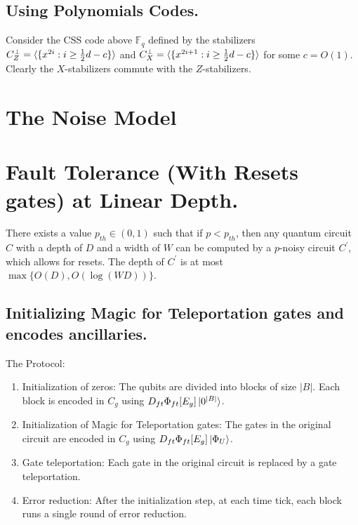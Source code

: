 \documentclass[manuscript,screen,review]{acmart}
\begin{document}
{\subsection{Using Polynomials Codes.} Consider the CSS code above $\mathbb{F}_{q}$ defined by the stabilizers $C_{Z}^{\perp} = \braket{\{ x^{2i} : i\ge \frac{1}{2}d - c \}}$ and $C_{X}^{\perp} = \braket{\{ x^{2i+1} : i \ge \frac{1}{2}d - c \}}$ for some $c = O(1)$. Clearly the $X$-stabilizers commute with the $Z$-stabilizers. 



\section{ The Noise Model }


\section{ Fault Tolerance (With Resets gates) at Linear Depth. } 

\begin{claim}
There exists a value $p_{th} \in (0,1)$ such that if $p < p_{th}$, then any quantum circuit $C$ with a depth of $D$ and a width of $W$ can be computed by a $p$-noisy circuit $C^{\prime}$, which allows for resets. The depth of $C^{\prime}$ is at most $\max{ \{O(D), O(\log(WD)) \} }$.
\end{claim}


\subsection{Initializing Magic for Teleportation gates and encodes ancillaries.}
The Protocol: \begin{enumerate}
  \item Initialization of zeros: The qubits are divided into blocks of size $|B|$. Each block is encoded in $C_{g}$ using $D_{ft} \Phi_{ft}[E_{g}] \ket{0^{|B|}}$.
  \item Initialization of Magic for Teleportation gates: The gates in the original circuit are encoded in $C_{g}$ using $D_{ft} \Phi_{ft}[E_{g}] \ket{\Phi_{U}}$.
  \item Gate teleportation: Each gate in the original circuit is replaced by a gate teleportation.
  \item Error reduction: After the initialization step, at each time tick, each block runs a single round of error reduction.
\end{enumerate}

}
\end{document}
